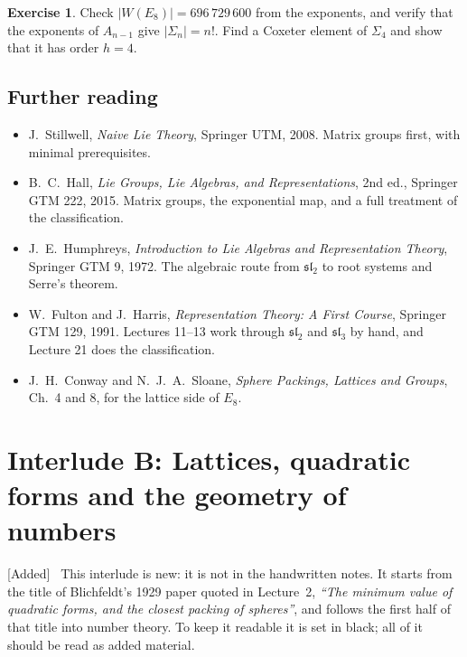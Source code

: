 \documentclass[11pt,openany]{book}
\theoremstyle{plain}
\theoremstyle{definition}
\newtheorem{exercise}[theorem]{Exercise}
\theoremstyle{remark}
\newenvironment{addedblock}{\par\color{addcol}\noindent\textsf{\small[Added]}\ }{\par}
\newcommand{\abs}[1]{\left\lvert #1 \right\rvert}
\begin{document}
\begin{exercise}
Check $\abs{W(E_8)}=696\,729\,600$ from the exponents, and verify that the exponents of $A_{n-1}$ give
$\abs{\Sigma_n}=n!$. Find a Coxeter element of $\Sigma_4$ and show that it has order $h=4$.
\end{exercise}

\section*{Further reading}
\begin{itemize}[nosep]
\item J.~Stillwell, \emph{Naive Lie Theory}, Springer UTM, 2008. Matrix groups first, with minimal prerequisites.
\item B.~C.~Hall, \emph{Lie Groups, Lie Algebras, and Representations}, 2nd ed., Springer GTM 222, 2015.
  Matrix groups, the exponential map, and a full treatment of the classification.
\item J.~E.~Humphreys, \emph{Introduction to Lie Algebras and Representation Theory}, Springer GTM 9, 1972.
  The algebraic route from $\mathfrak{sl}_2$ to root systems and Serre's theorem.
\item W.~Fulton and J.~Harris, \emph{Representation Theory: A First Course}, Springer GTM 129, 1991.
  Lectures 11--13 work through $\mathfrak{sl}_2$ and $\mathfrak{sl}_3$ by hand, and Lecture 21 does the classification.
\item J.~H.~Conway and N.~J.~A.~Sloane, \emph{Sphere Packings, Lattices and Groups}, Ch.~4 and 8, for the
  lattice side of $E_8$.
\end{itemize}
\endgroup
\begingroup\renewcommand{\thechapter}{B}\renewcommand{\theHchapter}{interludeB}

\chapter[Interlude B: Number theory]{Interlude B: Lattices, quadratic forms and the geometry of numbers}
\label{NT:ch}

\begin{addedblock}
This interlude is new: it is not in the handwritten notes. It starts from the title of Blichfeldt's
1929 paper quoted in Lecture~2, \emph{``The minimum value of quadratic forms, and the closest packing of
spheres''}, and follows the first half of that title into number theory. To keep it readable it is set
in black; all of it should be read as added material.
\end{addedblock}
\end{document}

